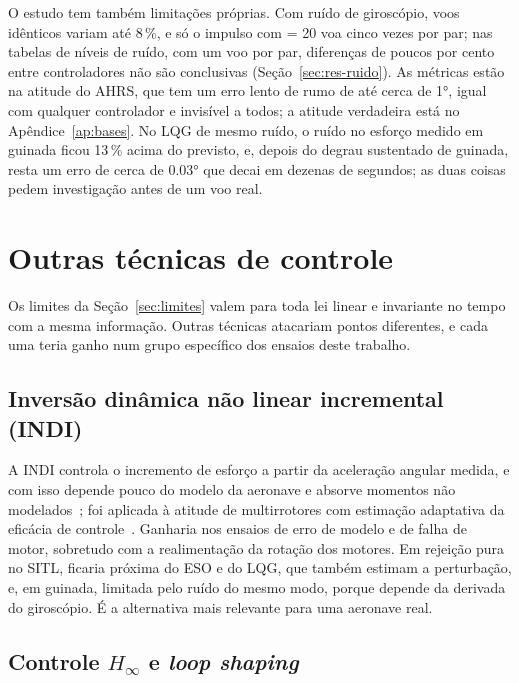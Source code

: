 O estudo tem também limitações próprias. Com ruído de giroscópio, voos
idênticos variam até 8\,\%, e só o impulso com
 = 20 voa cinco vezes por par; nas tabelas de níveis
de ruído, com um voo por par, diferenças de poucos por cento entre
controladores não são conclusivas (Seção~\ref{sec:res-ruido}). As métricas
estão na atitude do AHRS, que tem um erro lento de rumo de até cerca de
\ang{1}, igual com qualquer controlador e invisível a todos; a atitude
verdadeira está no Apêndice~\ref{ap:bases}. No LQG de mesmo ruído, o ruído
no esforço medido em guinada ficou 13\,\% acima do previsto, e, depois do
degrau sustentado de guinada, resta um erro de cerca de \ang{0.03} que decai
em dezenas de segundos; as duas coisas pedem investigação antes de um voo
real.

\section{Outras técnicas de controle}
\label{sec:outras-tecnicas}

Os limites da Seção~\ref{sec:limites} valem para toda lei linear e invariante
no tempo com a mesma informação. Outras técnicas atacariam pontos diferentes,
e cada uma teria ganho num grupo específico dos ensaios deste trabalho.

\subsection{Inversão dinâmica não linear incremental (INDI)}

A INDI controla
o incremento de esforço a partir da aceleração angular medida, e com isso
depende pouco do modelo da aeronave e absorve momentos não
modelados~\cite{sieberling2010}; foi aplicada à atitude de multirrotores com
estimação adaptativa da eficácia de controle~\cite{smeur2016}. Ganharia nos
ensaios de erro de modelo e de falha de motor, sobretudo com a realimentação
da rotação dos motores. Em rejeição pura no SITL, ficaria próxima do ESO e do
LQG, que também estimam a perturbação, e, em guinada, limitada pelo ruído do
mesmo modo, porque depende da derivada do giroscópio. É a alternativa mais
relevante para uma aeronave real.

\subsection{\texorpdfstring{Controle $H_\infty$ e \textit{loop shaping}}{Controle H-infinito e loop shaping}}

